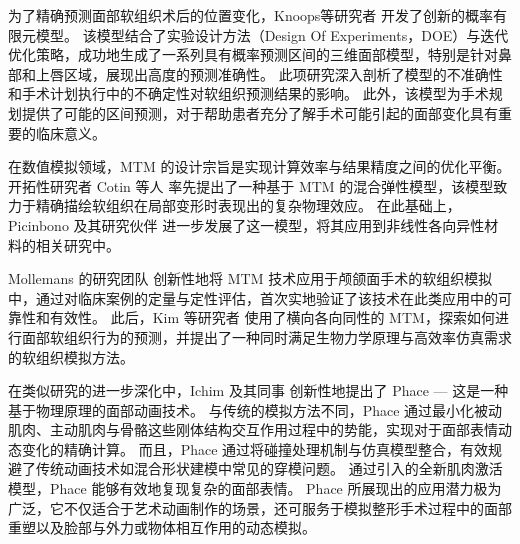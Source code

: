 为了精确预测面部软组织术后的位置变化，Knoops等研究者 \cite{knoopsNovelSoftTissue2018} 开发了创新的概率有限元模型。
该模型结合了实验设计方法（Design Of Experiments，DOE）与迭代优化策略，成功地生成了一系列具有概率预测区间的三维面部模型，特别是针对鼻部和上唇区域，展现出高度的预测准确性。
此项研究深入剖析了模型的不准确性和手术计划执行中的不确定性对软组织预测结果的影响。
此外，该模型为手术规划提供了可能的区间预测，对于帮助患者充分了解手术可能引起的面部变化具有重要的临床意义。

在数值模拟领域，MTM 的设计宗旨是实现计算效率与结果精度之间的优化平衡。
开拓性研究者 Cotin 等人 \cite{cotinHybridElasticModel2000} 率先提出了一种基于 MTM 的混合弹性模型，该模型致力于精确描绘软组织在局部变形时表现出的复杂物理效应。
在此基础上，Picinbono 及其研究伙伴 \cite{picinbonoNonlinearAnisotropicElasticity2003} 进一步发展了这一模型，将其应用到非线性各向异性材料的相关研究中。

Mollemans 的研究团队 \cite{mollemansPredictingSoftTissue2007} 创新性地将 MTM 技术应用于颅颌面手术的软组织模拟中，通过对临床案例的定量与定性评估，首次实地验证了该技术在此类应用中的可靠性和有效性。
此后，Kim 等研究者 \cite{kimNewSofttissueSimulation2010} 使用了横向各向同性的 MTM，探索如何进行面部软组织行为的预测，并提出了一种同时满足生物力学原理与高效率仿真需求的软组织模拟方法。

在类似研究的进一步深化中，Ichim 及其同事 \cite{ichimPhacePhysicsbasedFace2017} 创新性地提出了 Phace --- 这是一种基于物理原理的面部动画技术。
与传统的模拟方法不同，Phace 通过最小化被动肌肉、主动肌肉与骨骼这些刚体结构交互作用过程中的势能，实现对于面部表情动态变化的精确计算。
而且，Phace 通过将碰撞处理机制与仿真模型整合，有效规避了传统动画技术如混合形状建模中常见的穿模问题。
通过引入的全新肌肉激活模型，Phace 能够有效地复现复杂的面部表情。
Phace 所展现出的应用潜力极为广泛，它不仅适合于艺术动画制作的场景，还可服务于模拟整形手术过程中的面部重塑以及脸部与外力或物体相互作用的动态模拟。
